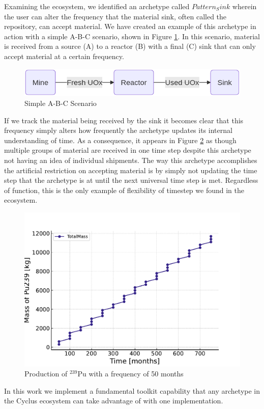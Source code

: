Examining the \cyclus ecosystem, we identified an archetype called $Pattern_Sink$ wherein the user can alter the frequency that the material sink, often called the repository, can accept material. We have created an example of this archetype in action with a simple A-B-C scenario, shown in Figure \ref{fig:a-b-c}. In this scenario, material is received from a source (A) to a reactor (B) with a final (C) sink that can only accept material at a certain frequency.

\begin{figure}
    \centering
    \includegraphics[scale=0.4]{images/cyclus/a-b-c.png}
    \caption{Simple A-B-C Scenario}
    \label{fig:a-b-c}
\end{figure}

If we track the material being received by the sink it becomes clear that this frequency simply alters how frequently the archetype updates its internal understanding of time. As a consequence, it appears in Figure \ref{fig:pattern_freq_50} as though multiple groups of material are received in one time step despite this archetype not having an idea of individual shipments. The way this archetype accomplishes the artificial restriction on accepting material is by simply not updating the time step that the archetype is at until the next universal time step is met. Regardless of function, this is the only example of flexibility of timestep we found in the ecosystem.

\begin{figure}
    \centering
    \includegraphics[scale=0.4]{images/cyclus/pattern_sink_fuel_transactions.pdf}
    \caption{Production of $^{239}$Pu with a frequency of 50 months}
    \label{fig:pattern_freq_50}
\end{figure}

In this work we implement a fundamental toolkit capability that any archetype in the Cyclus ecosystem can take advantage of with one implementation.
